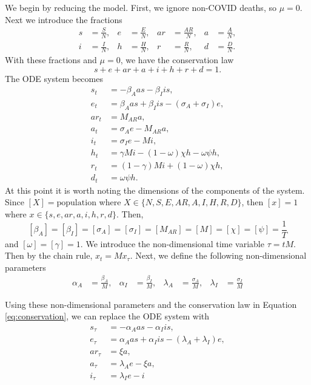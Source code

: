 \documentclass[11pt]{article}
\begin{document}
	We begin by reducing the model.
	First, we ignore non-COVID deaths, so $\mu = 0$.
	Next we introduce the fractions
	\begin{align*}
		s &= \frac{S}{N}, & e &= \frac{E}{N}, & ar &= \frac{AR}{N}, & a &= \frac{A}{N}, \\
		i &= \frac{I}{N}, & h &= \frac{H}{N}, & r &= \frac{R}{N}, & d &= \frac{D}{N}.
	\end{align*}
	With these fractions and $\mu = 0$, we have the conservation law
	\begin{equation} \label{eq:conservation}
		s + e + ar + a + i + h + r + d = 1.
	\end{equation}
	The ODE system becomes
	\begin{align*}
		s_t &=	 - \beta_{A} a s - \beta_{I} i s, \\
		e_t	&=	\beta_{A} a s + \beta_{I} i s - (\sigma_A + \sigma_I) e, \\
		ar_t &= M_{AR} a, \\
		a_t	&=	\sigma_A e - M_{AR} a, \\
		i_t	&=	\sigma_I e - M i, \\
		h_t	&=	\gamma M i - (1 - \omega) \chi h - \omega \psi h, \\
		r_t	&=	(1 - \gamma) M i + (1 - \omega) \chi h, \\
		d_t	&=	\omega \psi h.
	\end{align*}
	At this point it is worth noting the dimensions of the components of the system.
	Since $[X] = \mathrm{population}$ where $X \in \{N, S, E, AR, A, I, H, R, D\}$, then $[x] = 1$ where $x \in \{s, e, ar, a, i, h, r, d\}$.
	Then,
	$$[\beta_A] = [\beta_I] = [\sigma_A] = [\sigma_I] = [M_{AR}] = [M] = [\chi] = [\psi] = \frac{1}{T}$$
	and $[\omega] = [\gamma] = 1$.
	We introduce the non-dimensional time variable $\tau = t M$.
	Then by the chain rule, $x_t = M x_\tau$.
	Next, we define the following non-dimensional parameters
	\begin{align*}
		\alpha_A &= \frac{\beta_A}{M}, & \alpha_I &= \frac{\beta_I}{M}, & \lambda_A &= \frac{\sigma_A}{M}, & \lambda_I &= \frac{\sigma_I}{M}
	\end{align*}
	
	Using these non-dimensional parameters and the conservation law in Equation \ref{eq:conservation}, we can replace the ODE system with
	\begin{align}
		s_\tau &= - \alpha_A a s - \alpha_I i s, \\
		e_\tau &= \alpha_A a s + \alpha_I i s - (\lambda_A + \lambda_I) e, \\
		ar_\tau &= \xi a, \\
		a_\tau &= \lambda_A e - \xi a, \\
		i_\tau &= \lambda_I e - i
	\end{align}
	
\end{document}
